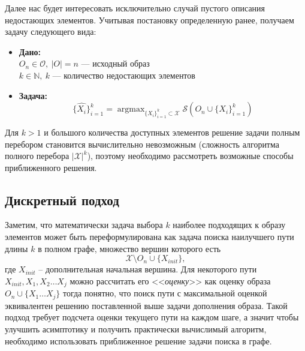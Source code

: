 \documentclass[a4paper,12pt]{article}
\DeclareMathOperator*{\argmax}{argmax}
\begin{document}
				Далее нас будет интересовать исключительно случай пустого описания недостающих элементов. Учитывая постановку определенную ранее, получаем задачу следующего вида:
				\begin{itemize}
					\item \textbf{Дано:}\\
					$O_n\in\mathcal{O}, ~|O| = n$ --- исходный образ \\
					$k \in \mathbb{N}, ~k$ --- количество недостающих элементов\\					
					\item \textbf{Задача:}\\
					$$\{\hat{X_i}\}_{i=1}^k= \argmax_{\{X_i\}_{i=1}^k\subset\mathcal{X}} \mathcal{S}\left(O_n\cup\{X_i\}_{i=1}^k\right)$$
				\end{itemize}
				Для $k > 1$ и большого количества доступных элементов решение задачи полным перебором  становится вычислительно невозможным (сложность алгоритма полного перебора $|\mathcal{X}|^k$), поэтому необходимо рассмотреть возможные способы приближенного решения. 
				
			\subsection{Дискретный подход}\label{discrete}
			Заметим, что математически задача выбора $k$ наиболее подходящих к образу элементов может быть переформулирована как задача поиска наилучшего пути длины $k$ в полном графе, множество вершин которого есть 
			$$\mathcal{X}\setminus O_n \cup \{X_{init}\},$$ где $X_{init}$ -- дополнительная начальная вершина. Для некоторого пути $X_{init}, X_1, X_2\dots X_j$ можно рассчитать его <<\textit{оценку}>> как оценку образа $O_n\cup\{X_1\dots X_j\}$ тогда понятно, что поиск пути с максимальной оценкой эквивалентен решению поставленной выше задачи дополнения образа. Такой подход требует подсчета оценки текущего пути на каждом шаге, а значит чтобы улучшить асимптотику и получить практически вычислимый алгоритм, необходимо использовать приближенное решение задачи поиска в графе.
			
\end{document}

